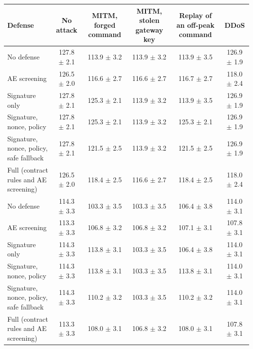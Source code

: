 \begin{tabular}{@{}lccccc@{}}
\toprule
Defense & No attack & MITM, forged command & MITM, stolen gateway key & Replay of an off-peak command & DDoS \\
\midrule
No defense & 127.8 $\pm$ 2.1 & 113.9 $\pm$ 3.2 & 113.9 $\pm$ 3.2 & 113.9 $\pm$ 3.5 & 126.9 $\pm$ 1.9 \\
AE screening & 126.5 $\pm$ 2.0 & 116.6 $\pm$ 2.7 & 116.6 $\pm$ 2.7 & 116.7 $\pm$ 2.7 & 118.0 $\pm$ 2.4 \\
Signature only & 127.8 $\pm$ 2.1 & 125.3 $\pm$ 2.1 & 113.9 $\pm$ 3.2 & 113.9 $\pm$ 3.5 & 126.9 $\pm$ 1.9 \\
Signature, nonce, policy & 127.8 $\pm$ 2.1 & 125.3 $\pm$ 2.1 & 113.9 $\pm$ 3.2 & 125.3 $\pm$ 2.1 & 126.9 $\pm$ 1.9 \\
Signature, nonce, policy, safe fallback & 127.8 $\pm$ 2.1 & 121.5 $\pm$ 2.5 & 113.9 $\pm$ 3.2 & 121.5 $\pm$ 2.5 & 126.9 $\pm$ 1.9 \\
Full (contract rules and AE screening) & 126.5 $\pm$ 2.0 & 118.4 $\pm$ 2.5 & 116.6 $\pm$ 2.7 & 118.4 $\pm$ 2.5 & 118.0 $\pm$ 2.4 \\
\midrule
No defense & 114.3 $\pm$ 3.3 & 103.3 $\pm$ 3.5 & 103.3 $\pm$ 3.5 & 106.4 $\pm$ 3.8 & 114.0 $\pm$ 3.1 \\
AE screening & 113.3 $\pm$ 3.3 & 106.8 $\pm$ 3.2 & 106.8 $\pm$ 3.2 & 107.1 $\pm$ 3.1 & 107.8 $\pm$ 3.1 \\
Signature only & 114.3 $\pm$ 3.3 & 113.8 $\pm$ 3.1 & 103.3 $\pm$ 3.5 & 106.4 $\pm$ 3.8 & 114.0 $\pm$ 3.1 \\
Signature, nonce, policy & 114.3 $\pm$ 3.3 & 113.8 $\pm$ 3.1 & 103.3 $\pm$ 3.5 & 113.8 $\pm$ 3.1 & 114.0 $\pm$ 3.1 \\
Signature, nonce, policy, safe fallback & 114.3 $\pm$ 3.3 & 110.2 $\pm$ 3.2 & 103.3 $\pm$ 3.5 & 110.2 $\pm$ 3.2 & 114.0 $\pm$ 3.1 \\
Full (contract rules and AE screening) & 113.3 $\pm$ 3.3 & 108.0 $\pm$ 3.1 & 106.8 $\pm$ 3.2 & 108.0 $\pm$ 3.1 & 107.8 $\pm$ 3.1 \\
\bottomrule
\end{tabular}